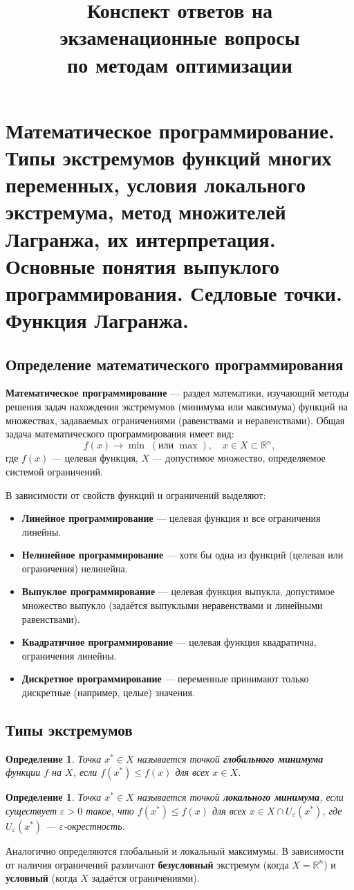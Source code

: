 \documentclass{article}
\title{Конспект ответов на экзаменационные вопросы \\ по методам оптимизации}
\author{}
\date{}
\theoremstyle{plain}
\newtheorem{definition}[theorem]{Определение}
\begin{document}
\maketitle

\section{Математическое программирование. Типы экстремумов функций многих переменных, условия локального экстремума, метод множителей Лагранжа, их интерпретация. Основные понятия выпуклого программирования. Седловые точки. Функция Лагранжа.}

\subsection{Определение математического программирования}
\textbf{Математическое программирование} — раздел математики, изучающий методы решения задач нахождения экстремумов (минимума или максимума) функций на множествах, задаваемых ограничениями (равенствами и неравенствами). Общая задача математического программирования имеет вид:
\[
f(x) \to \min \;(\text{или } \max),\quad x \in X \subset \mathbb{R}^n,
\]
где $f(x)$ — целевая функция, $X$ — допустимое множество, определяемое системой ограничений.

В зависимости от свойств функций и ограничений выделяют:
\begin{itemize}
  \item \textbf{Линейное программирование} — целевая функция и все ограничения линейны.
  \item \textbf{Нелинейное программирование} — хотя бы одна из функций (целевая или ограничения) нелинейна.
  \item \textbf{Выпуклое программирование} — целевая функция выпукла, допустимое множество выпукло (задаётся выпуклыми неравенствами и линейными равенствами).
  \item \textbf{Квадратичное программирование} — целевая функция квадратична, ограничения линейны.
  \item \textbf{Дискретное программирование} — переменные принимают только дискретные (например, целые) значения.
\end{itemize}

\subsection{Типы экстремумов}
\begin{definition}
Точка $x^* \in X$ называется точкой \textbf{глобального минимума} функции $f$ на $X$, если $f(x^*) \le f(x)$ для всех $x \in X$.
\end{definition}
\begin{definition}
Точка $x^* \in X$ называется точкой \textbf{локального минимума}, если существует $\varepsilon > 0$ такое, что $f(x^*) \le f(x)$ для всех $x \in X \cap U_\varepsilon(x^*)$, где $U_\varepsilon(x^*)$ — $\varepsilon$-окрестность.
\end{definition}
Аналогично определяются глобальный и локальный максимумы. В зависимости от наличия ограничений различают \textbf{безусловный} экстремум (когда $X = \mathbb{R}^n$) и \textbf{условный} (когда $X$ задаётся ограничениями).
\end{document}
